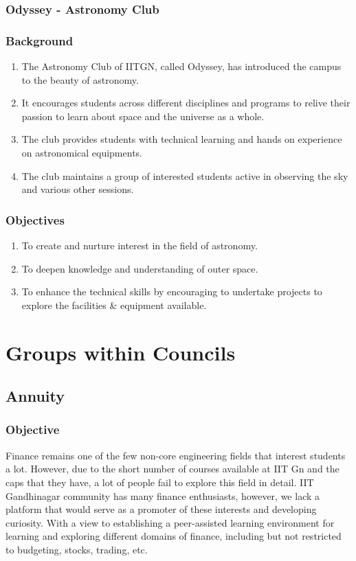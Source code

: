 \documentclass[12pt]{article}
\begin{document}
\subsubsection{Odyssey - Astronomy Club}
\subsubsection*{Background}
\begin{enumerate}
    \item The Astronomy Club of IITGN, called Odyssey, has introduced the campus to the beauty of astronomy.
    \item It encourages students across different disciplines and programs to relive their passion to learn about space and the universe as a whole.
    \item The club provides students with technical learning and hands on experience on astronomical equipments.
    \item The club maintains a group of interested students active in observing the sky and various other sessions.
\end{enumerate}

\subsubsection*{Objectives}
\begin{enumerate}
    \item To create and nurture interest in the field of astronomy.
    \item To deepen knowledge and understanding of outer space.
    \item To enhance the technical skills by encouraging to undertake projects to explore the facilities \& equipment available.
\end{enumerate}



\newpage
\section{Groups within Councils}

\subsection{Annuity}
\subsubsection{Objective}
Finance remains one of the few non-core engineering fields that interest students a lot. However, due to the short number of courses available at IIT Gn and the caps that they have, a lot of people fail to explore this field in detail. IIT Gandhinagar community has many finance enthusiasts, however, we lack a platform that would serve as a promoter of these interests and developing curiosity. With a view to establishing a peer-assisted learning environment for learning and exploring different domains of finance, including but not restricted to budgeting, stocks, trading, etc.
\end{document}
